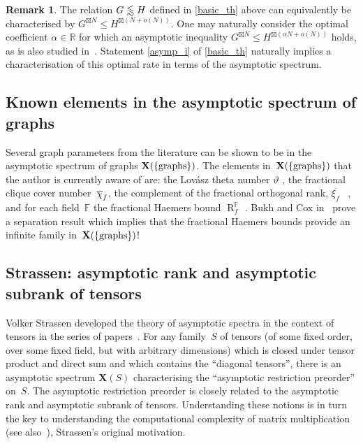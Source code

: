 \documentclass[a4paper, fleqn]{amsart}
\theoremstyle{plain}
\theoremstyle{definition}
\newtheorem{remark}[theorem]{Remark}
\DeclareMathOperator{\rank}{R}
\newcommand{\FF}{\mathbb{F}}
\newcommand{\RR}{\mathbb{R}}
\newcommand{\jeroen}[1]{#1}
\let\leqx\leqslant
\newcommand{\asympleqx}{%
  \mathrel{%
    \vphantom{\leqslant}%
    \smash{\vcenter{\doasympleqx}}%
  }%
}
\newcommand{\doasympleqx}{%
  \hbox{\ooalign{%
    \noalign{\kern.25ex}
    $\leqslant$\cr
    \noalign{\kern1.25ex}
    \smash{$\sim$}\cr
  }}%
}
\newcommand{\semiring}[1]{#1}
\newcommand{\aspec}{\mathbf{X}}
\newcommand{\textgraphs}{\{\textnormal{graphs}\}}
\let\leqx\leqslant
\begin{document}
\jeroen{
\begin{remark}
The relation $G \asympleqx H$ defined in \cref{basic_th} above can equivalently be characterised by $G^{\boxtimes N} \leqx H^{\boxtimes (N + o(N))}$. %
One may naturally consider the optimal coefficient $\alpha \in \RR$ for which an asymptotic inequality $G^{\boxtimes N} \leqx H^{\boxtimes (\alpha N + o(N))}$ holds, as is also studied in~\cite{wang2017graph}. Statement \ref{asymp_i} of \cref{basic_th} naturally implies a characterisation of this optimal rate in terms of the asymptotic spectrum.
\end{remark}
}

\subsection{Known elements in the asymptotic spectrum of graphs}
Several graph parameters from the literature can be shown to be in the asymptotic spectrum of graphs $\aspec(\textgraphs)$.
%
The elements in~$\aspec(\{\textnormal{graphs}\})$ that the author is currently aware of are: the Lovász theta number $\vartheta$ \cite{lovasz1979shannon}, the fractional clique cover number~$\overline{\chi}_{\smash{f}}$, the complement of the fractional orthogonal rank, $\overline{\xi_f}$%
%
~\cite{cubitt2014bounds}, and for each field~$\FF$ the fractional Haemers bound $\rank^\FF_f$ \cite{blasiak2013graph,bukh2018fractional}. Bukh and Cox in~\cite{bukh2018fractional} prove a separation result which implies that the fractional Haemers bounds provide an infinite family in~$\aspec(\{\textnormal{graphs}\})$!


\subsection{Strassen: asymptotic rank and asymptotic subrank of tensors}\label{tensors}
Volker Strassen developed the theory of asymptotic spectra in the context of tensors in the series of papers~\cite{Strassen:1986:AST:1382439.1382931, strassen1987relative, strassen1988asymptotic, strassen1991degeneration}. For any family~$\semiring{S}$ of tensors  (of some fixed order, over some fixed field, but with arbitrary dimensions) which is closed under tensor product and direct sum and which contains the ``diagonal tensors'', there is an asymptotic spectrum $\aspec(\semiring{S})$ characterising the ``asymptotic restriction preorder'' on~$\semiring{S}$. The asymptotic restriction preorder is closely related to the asymptotic rank and asymptotic subrank of tensors. Understanding these notions is in turn the key to understanding the computational complexity of matrix multiplication (see also~\cite{burgisser1997algebraic}), Strassen's original motivation.
\end{document}
